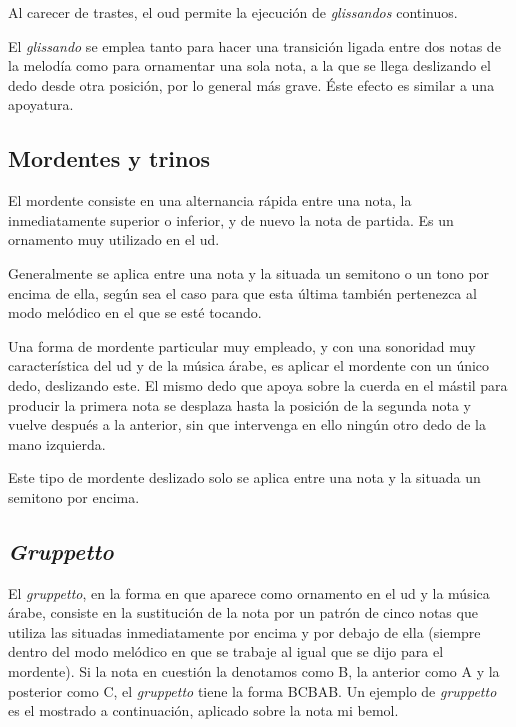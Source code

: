Al carecer de trastes, el oud permite la ejecución de \emph{glissandos} continuos.

El \emph{glissando} se emplea tanto para hacer una transición ligada entre dos notas de la melodía como para ornamentar una sola nota, a la que se llega deslizando el dedo desde otra posición, por lo general más grave. Éste efecto es similar a una apoyatura.


\subsection{Mordentes y trinos}

El mordente consiste en una alternancia rápida entre una nota, la inmediatamente superior o inferior, y de nuevo la nota de partida. Es un ornamento muy utilizado en el ud.

Generalmente se aplica entre una nota y la situada un semitono o un tono por encima de ella, según sea el caso para que esta última también pertenezca al modo melódico en el que se esté tocando.


Una forma de mordente particular muy empleado, y con una sonoridad muy característica del ud y de la música árabe, es aplicar el mordente con un único dedo, deslizando este. El mismo dedo que apoya sobre la cuerda en el mástil para producir la primera nota se desplaza hasta la posición de la segunda nota y vuelve después a la anterior, sin que intervenga en ello ningún otro dedo de la mano izquierda.


Este tipo de mordente deslizado solo se aplica entre una nota y la situada un semitono por encima.

\subsection{\emph{Gruppetto}}

El \emph{gruppetto}, en la forma en que aparece como ornamento en el ud y la música árabe, consiste en la sustitución de la nota por un patrón de cinco notas que utiliza las situadas inmediatamente por encima y por debajo de ella (siempre dentro del modo melódico en que se trabaje al igual que se dijo para el mordente). Si la nota en cuestión la denotamos como B, la anterior como A y la posterior como C, el \emph{gruppetto} tiene la forma BCBAB. Un ejemplo de \emph{gruppetto} es el mostrado a continuación, aplicado sobre la nota mi bemol.


